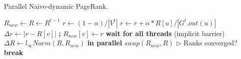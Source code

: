 \begin{algorithm}[!hbt]
\caption{Parallel Naive-dynamic PageRank.}
\label{alg:prnd}
\begin{algorithmic}[1]

\Statex

  \State $R_{new} \gets R \gets R^{t-1}$
  \ForAll{$i \in [0 .. MAX\_ITERATIONS)$}
      \State $r \gets (1 - \alpha)/|V^t|$
        \State $r \gets r + \alpha * R[u] / |G^t.out(u)|$
      \EndFor
      \State $\Delta r \gets |r - R[v]|$ \textbf{;} $R_{new}[v] \gets r$
    \EndFor
    \State \textbf{wait for all threads} (implicit barrier)
    \State $\Delta R \gets l_\infty Norm(R, R_{new})$ \textbf{in parallel}
    \State $swap(R_{new}, R)$
    \State $\rhd$ Ranks converged?
     \textbf{break}
    \EndIf
  \EndFor
\EndFunction
\end{algorithmic}
\end{algorithm}





